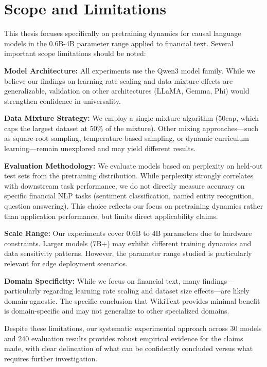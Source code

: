 \section{Scope and Limitations}

This thesis focuses specifically on pretraining dynamics for causal language models in the 0.6B-4B parameter range applied to financial text. Several important scope limitations should be noted:

\textbf{Model Architecture:} All experiments use the Qwen3 model family. While we believe our findings on learning rate scaling and data mixture effects are generalizable, validation on other architectures (LLaMA, Gemma, Phi) would strengthen confidence in universality.

\textbf{Data Mixture Strategy:} We employ a single mixture algorithm (50cap, which caps the largest dataset at 50\% of the mixture). Other mixing approaches—such as square-root sampling, temperature-based sampling, or dynamic curriculum learning—remain unexplored and may yield different results.

\textbf{Evaluation Methodology:} We evaluate models based on perplexity on held-out test sets from the pretraining distribution. While perplexity strongly correlates with downstream task performance, we do not directly measure accuracy on specific financial NLP tasks (sentiment classification, named entity recognition, question answering). This choice reflects our focus on pretraining dynamics rather than application performance, but limits direct applicability claims.

\textbf{Scale Range:} Our experiments cover 0.6B to 4B parameters due to hardware constraints. Larger models (7B+) may exhibit different training dynamics and data sensitivity patterns. However, the parameter range studied is particularly relevant for edge deployment scenarios.

\textbf{Domain Specificity:} While we focus on financial text, many findings—particularly regarding learning rate scaling and dataset size effects—are likely domain-agnostic. The specific conclusion that WikiText provides minimal benefit is domain-specific and may not generalize to other specialized domains.

Despite these limitations, our systematic experimental approach across 30 models and 240 evaluation results provides robust empirical evidence for the claims made, with clear delineation of what can be confidently concluded versus what requires further investigation.

